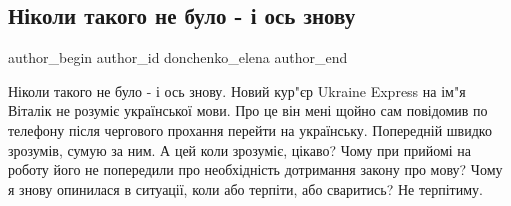  
 
 
 
 
 
\subsection{Ніколи такого не було - і ось знову}
\label{sec:18_09_2021.fb.donchenko_elena.1.kurjer_mova}
 
\ifcmt
 author_begin
   author_id donchenko_elena
 author_end
\fi

\obeycr
Ніколи такого не було - і ось знову. 
Новий кур"єр Ukraine Express на ім"я Віталік не розуміє української мови. 
Про це він мені щойно сам повідомив по телефону після чергового прохання перейти на українську.
Попередній швидко зрозумів, сумую за ним.
А цей коли зрозуміє, цікаво? 
Чому при прийомі на роботу його не попередили про необхідність дотримання закону про мову?
Чому я знову опинилася в ситуації, коли або терпіти, або сваритись? 
Не терпітиму.
\restorecr

